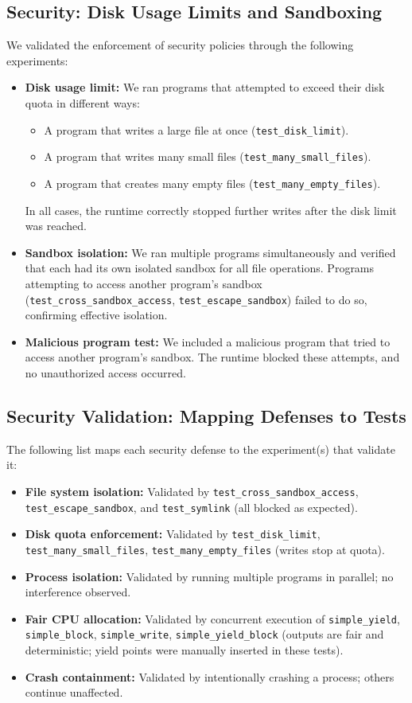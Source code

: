 \documentclass[10pt,a4paper,twocolumn]{IEEEtran}
\begin{document}
\subsection{Security: Disk Usage Limits and Sandboxing}
We validated the enforcement of security policies through the following experiments:
\begin{itemize}
    \item \textbf{Disk usage limit:} We ran programs that attempted to exceed their disk quota in different ways:
    \begin{itemize}
        \item A program that writes a large file at once (\texttt{test\_disk\_limit}).
        \item A program that writes many small files (\texttt{test\_many\_small\_files}).
        \item A program that creates many empty files (\texttt{test\_many\_empty\_files}).
    \end{itemize}
    In all cases, the runtime correctly stopped further writes after the disk limit was reached.
    \item \textbf{Sandbox isolation:} We ran multiple programs simultaneously and verified that each had its own isolated sandbox for all file operations. Programs attempting to access another program's sandbox (\texttt{test\_cross\_sandbox\_access}, \texttt{test\_escape\_sandbox}) failed to do so, confirming effective isolation.
    \item \textbf{Malicious program test:} We included a malicious program that tried to access another program's sandbox. The runtime blocked these attempts, and no unauthorized access occurred.
\end{itemize}

\subsection*{Security Validation: Mapping Defenses to Tests}
The following list maps each security defense to the experiment(s) that validate it:
\begin{itemize}
    \item \textbf{File system isolation:} Validated by \texttt{test\_cross\_sandbox\_access}, \texttt{test\_escape\_sandbox}, and \texttt{test\_symlink} (all blocked as expected).
    \item \textbf{Disk quota enforcement:} Validated by \texttt{test\_disk\_limit}, \texttt{test\_many\_small\_files}, \texttt{test\_many\_empty\_files} (writes stop at quota).
    \item \textbf{Process isolation:} Validated by running multiple programs in parallel; no interference observed.
    \item \textbf{Fair CPU allocation:} Validated by concurrent execution of \texttt{simple\_yield}, \texttt{simple\_block}, \texttt{simple\_write}, \texttt{simple\_yield\_block} (outputs are fair and deterministic; yield points were manually inserted in these tests).
    \item \textbf{Crash containment:} Validated by intentionally crashing a process; others continue unaffected.
\end{itemize}
\end{document}
